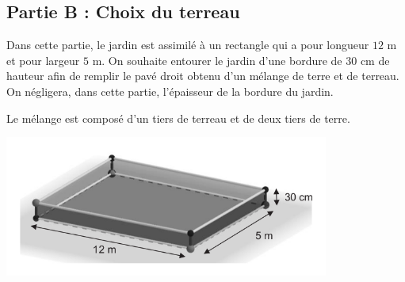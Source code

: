 \subsection*{Partie B : Choix du terreau}
Dans cette partie, le jardin est assimilé à un rectangle qui a pour longueur $12$ m et pour largeur
$5$ m. On souhaite entourer le jardin d'une bordure de $30$ cm de hauteur afin de remplir le pavé
droit obtenu d'un mélange de terre et de terreau. On négligera, dans cette partie, l'épaisseur
de la bordure du jardin.

Le mélange est composé d’un tiers de terreau et de deux tiers de terre.

\begin{center}
    \includegraphics[width=0.8\textwidth]{./images/2022-g3-ex3-img2.png}
\end{center}


